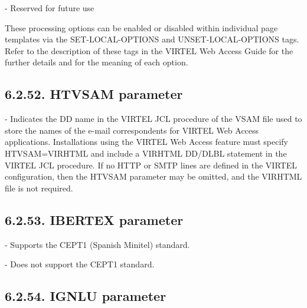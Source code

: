 \documentclass[letterpaper,10pt,english]{sphinxmanual}
\begin{document}
 - Reserved for future use

These processing options can be enabled or disabled within individual page templates via the SET-LOCAL-OPTIONS and UNSET-LOCAL-OPTIONS tags. Refer to the description of these tags in the VIRTEL Web Access Guide for the further details and for the meaning of each option.


\subsection{6.2.52. HTVSAM parameter}
\label{\detokenize{Installation_Guide:htvsam-parameter}}
\begin{sphinxVerbatim}[commandchars=\\\{\}]
                      
\end{sphinxVerbatim}

 - Indicates the DD name in the VIRTEL JCL procedure of the VSAM file used to store the names of the e-mail correspondents for VIRTEL Web Access applications. Installations using the VIRTEL Web Access feature must specify HTVSAM=VIRHTML and include a VIRHTML DD/DLBL statement in the VIRTEL JCL procedure. If no HTTP or SMTP lines are defined in the VIRTEL configuration, then the HTVSAM parameter may be omitted, and the VIRHTML file is not required.


\subsection{6.2.53. IBERTEX parameter}
\label{\detokenize{Installation_Guide:ibertex-parameter}}
\begin{sphinxVerbatim}[commandchars=\\\{\}]
                      
\end{sphinxVerbatim}

 - Supports the CEPT1 (Spanish Minitel) standard.

 - Does not support the CEPT1 standard.


\subsection{6.2.54. IGNLU parameter}
\label{\detokenize{Installation_Guide:ignlu-parameter}}
\begin{sphinxVerbatim}[commandchars=\\\{\}]
            
\end{sphinxVerbatim}
\end{document}
